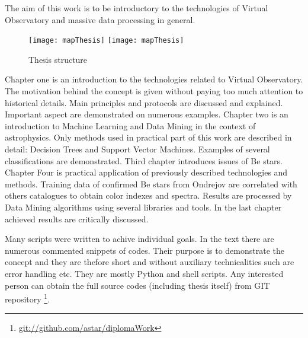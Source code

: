The aim of this work is to be introductory to the technologies of
Virtual Observatory and massive data processing in general.



\begin{figure}[!htbp]
  \begin{center}
    \leavevmode
    \ifpdf
    \texttt{[image: mapThesis]}
    \else
    \texttt{[image: mapThesis]}
    \fi
    \caption{Thesis structure}
    \label{FigStructure}
  \end{center}
\end{figure}


Chapter one is an introduction to the technologies related to Virtual
Observatory. The motivation behind the concept is given without paying
too much attention to historical details. Main principles and
protocols are discussed and explained. Important aspect are
demonstrated on numerous examples. Chapter two is an introduction to
Machine Learning and Data Mining in the context of astrophysics. Only
methods used in practical part of this work are described in detail:
Decision Trees and Support Vector Machines. Examples of several
classifications are demonstrated. Third chapter introduces issues of
Be stars. Chapter Four is practical application of previously
described technologies and methods. Training data of confirmed Be
stars from Ondrejov are correlated with others catalogues to obtain
color indexes and spectra. Results are processed by Data Mining
algorithms using several libraries and tools. In the last chapter
achieved results are critically discussed.

Many scripts were written to achive individual goals. In the text
there are numerous commented snippets of codes. Their purpose is to
demonstrate the concept and they are thefore short and without
auxiliary technicalities such are error handling etc. They are mostly
Python and shell scripts. Any interested person can obtain the full
source codes (including thesis itself) from GIT repository
\footnote{\url{git://github.com/astar/diplomaWork}}.



